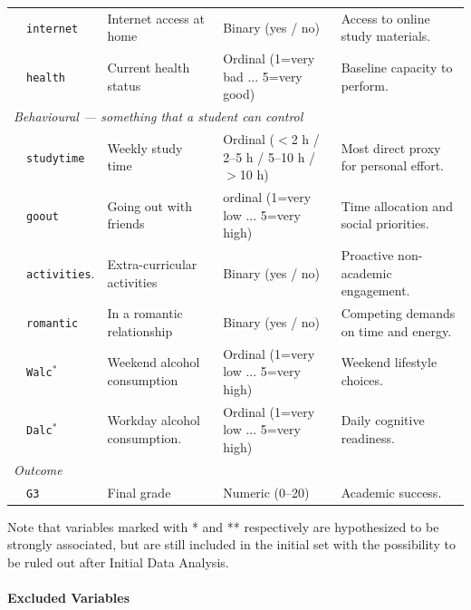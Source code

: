 \documentclass{article}
\begin{document}
\begin{table}[h!]
\begin{tabularx}{\textwidth}{llXp{4.5cm}X}
& \texttt{internet}     & Internet access at home      & Binary (yes / no)                                             & Access to online study materials. \\
& \texttt{health}       & Current health status        & Ordinal (1=very bad ... 5=very good)                          & Baseline capacity to perform. \\
\midrule
\multicolumn{5}{l}{\textit{Behavioural --- something that a student can control}} \\
\midrule
& \texttt{studytime}    & Weekly study time             & Ordinal ($<$2 h / 2--5 h / 5--10 h / $>$10 h)                & Most direct proxy for personal effort. \\
& \texttt{goout}        & Going out with friends        & ordinal (1=very low ... 5=very high)                         & Time allocation and social priorities. \\
& \texttt{activities}.  & Extra-curricular activities   & Binary (yes / no)                                            & Proactive non-academic engagement. \\
& \texttt{romantic}     & In a romantic relationship    & Binary (yes / no)                                            & Competing demands on time and energy. \\
& \texttt{Walc}$^{*}$   & Weekend alcohol consumption   & Ordinal (1=very low ... 5=very high)                         & Weekend lifestyle choices. \\
& \texttt{Dalc}$^{*}$   & Workday alcohol consumption.  & Ordinal (1=very low ... 5=very high)                         & Daily cognitive readiness. \\
\midrule
\multicolumn{5}{l}{\textit{Outcome}} \\
\midrule
& \texttt{G3} & Final grade & Numeric (0--20) & Academic success. \\
\bottomrule
\end{tabularx}
\label{tab:variables}
\end{table}

\noindent
Note that variables marked with * and ** respectively are hypothesized to be strongly associated, but are still included in the initial set with the possibility to be ruled out after Initial Data Analysis.


\paragraph{Excluded Variables}
\end{document}
